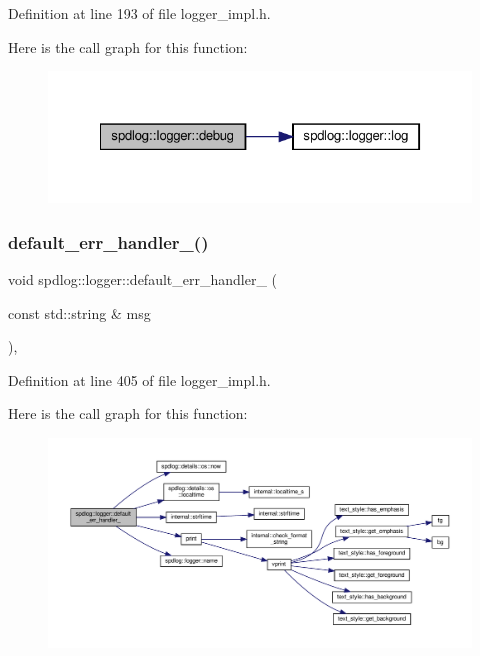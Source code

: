 Definition at line 193 of file logger\+\_\+impl.\+h.

Here is the call graph for this function\+:
\nopagebreak
\begin{figure}[H]
\begin{center}
\leavevmode
\includegraphics[width=322pt]{classspdlog_1_1logger_aca96637e71ab459738ccc7287be28c2e_cgraph}
\end{center}
\end{figure}
\mbox{\label{classspdlog_1_1logger_a3432e21bdc19d74024b57cc3f26a8471}} 
\subsubsection{\texorpdfstring{default\+\_\+err\+\_\+handler\+\_\+()}{default\_err\_handler\_()}}
{\footnotesize\ttfamily void spdlog\+::logger\+::default\+\_\+err\+\_\+handler\+\_\+ (\begin{DoxyParamCaption}\item[{const std\+::string \&}]{msg }\end{DoxyParamCaption})\hspace{0.3cm}{\ttfamily [inline]}, {\ttfamily [protected]}}



Definition at line 405 of file logger\+\_\+impl.\+h.

Here is the call graph for this function\+:
\nopagebreak
\begin{figure}[H]
\begin{center}
\leavevmode
\includegraphics[width=350pt]{classspdlog_1_1logger_a3432e21bdc19d74024b57cc3f26a8471_cgraph}
\end{center}
\end{figure}
\mbox{\label{classspdlog_1_1logger_a0d0307a6501a9f56689c386a006991fe}} 
